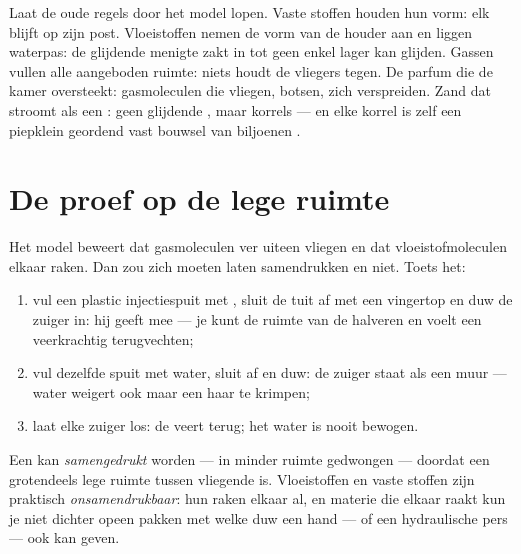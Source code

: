\begin{example}\label{ex:g7:states-of-matter:rules}
Laat de oude regels door het model lopen. Vaste stoffen houden hun
vorm: elk  blijft op zijn post. Vloeistoffen nemen de vorm
van de houder aan en liggen waterpas: de glijdende menigte zakt in
tot geen enkel  lager kan glijden. Gassen vullen alle
aangeboden ruimte: niets houdt de vliegers tegen. De parfum die de
kamer oversteekt: gasmoleculen die vliegen, botsen, zich
verspreiden. Zand dat stroomt als een : geen glijdende
, maar korrels --- en elke korrel is zelf een piepklein
geordend vast bouwsel van biljoenen .
\end{example}

\section{De proef op de lege ruimte}

\begin{method}\label{met:g7:states-of-matter:syringe}
Het model beweert dat gasmoleculen ver uiteen vliegen en dat
vloeistofmoleculen elkaar raken. Dan zou  zich moeten laten
samendrukken en  niet. Toets het:
\begin{enumerate}
  \item vul een plastic injectiespuit met , sluit de tuit af met
        een vingertop en duw de zuiger in: hij geeft mee --- je kunt
        de ruimte van de  halveren en voelt een veerkrachtig
        terugvechten;
  \item vul dezelfde spuit met water, sluit af en duw: de zuiger
        staat als een muur --- water weigert ook maar een haar te
        krimpen;
  \item laat elke zuiger los: de  veert terug; het water is
        nooit bewogen.
\end{enumerate}
\end{method}

\begin{proposition}\label{prop:g7:states-of-matter:squeeze}
Een  kan \emph{samengedrukt} worden --- in
minder ruimte gedwongen --- doordat een  grotendeels lege ruimte
tussen vliegende  is. Vloeistoffen en vaste stoffen
zijn praktisch \emph{onsamendrukbaar}: hun  raken elkaar al,
en materie die elkaar raakt kun je niet dichter opeen pakken met welke
duw een hand --- of een hydraulische pers --- ook kan geven.
\end{proposition}

